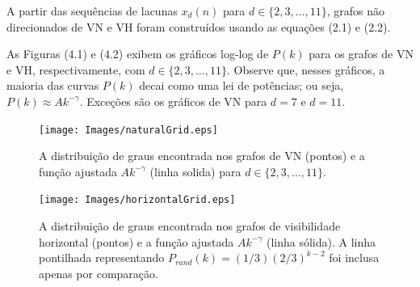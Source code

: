 \documentclass[12pt,a4paper,fleqn]{report}
\begin{document}
A partir das sequências de lacunas $x_d(n)$ para $d \in \{2, 3, \ldots, 11\}$,
grafos não direcionados de VN e VH foram construídos usando
as equações (2.1) e (2.2).

As Figuras (4.1) e (4.2)  exibem os gráficos
log-log de $P(k)$ para os grafos de VN e VH, respectivamente, com 
$d \in \{2, 3, \ldots, 11\}$. Observe que, nesses gráficos, a maioria das curvas
$P(k)$ decai como uma lei de potências; ou seja,  $P(k) \approx A k^{-\gamma}$. Exceções  são os gráficos de VN para $d=7$ e $d=11$.


\begin{figure}[H]
    \centering
    \texttt{[image: Images/naturalGrid.eps]}
    \caption{A distribuição de graus encontrada nos grafos de VN (pontos)
    e a função ajustada $A k^{-\gamma}$ (linha solida) para $d \in \{2, 3, \ldots, 11\}$.}
    \label{natural-degrees}
\end{figure}

\begin{figure}[H]
    \centering
    \texttt{[image: Images/horizontalGrid.eps]}
    \caption{A distribuição de graus encontrada nos grafos de visibilidade
    horizontal (pontos) e a função ajustada 
    $A k^{-\gamma}$ (linha sólida).
    A linha pontilhada representando $P_{rand}(k)= (1/3)(2/3)^{k-2}$
    foi inclusa apenas por comparação.}
    \label{horizontal-degrees}
\end{figure}

\end{document}
